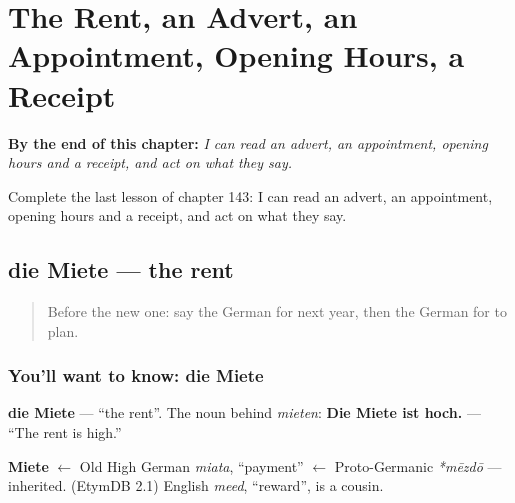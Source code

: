 
\chapter{The Rent, an Advert, an Appointment, Opening Hours, a Receipt}
\label{ch:ge-the-rent-an-advert-an-appointment-opening-hours-a-receipt}

\begin{chapteropening}
\textbf{By the end of this chapter:} \emph{I can read an advert, an appointment, opening hours and a receipt, and act on what they say.}

Complete the last lesson of chapter 143: I can read an advert, an appointment, opening hours and a receipt, and act on what they say.
\end{chapteropening}

\section[die Miete]{die Miete — the rent}

\label{lesson:GE-C143-miete}



\begin{quote}
Before the new one: say the German for next year, then the German for to plan.
\end{quote}

\subsection*{You'll want to know: die Miete}
\textbf{die Miete} — \textquotedblleft{}the rent\textquotedblright{}. The noun behind \emph{mieten}: \textbf{Die Miete ist hoch.} — \textquotedblleft{}The rent is high.\textquotedblright{}

\begin{cousinweb}
\textbf{Miete} $\leftarrow$ Old High German \emph{miata}, \textquotedblleft{}payment\textquotedblright{} $\leftarrow$ Proto-Germanic \emph{*mēzdō} — inherited. (EtymDB 2.1) English \emph{meed}, \textquotedblleft{}reward\textquotedblright{}, is a cousin.
\end{cousinweb}

